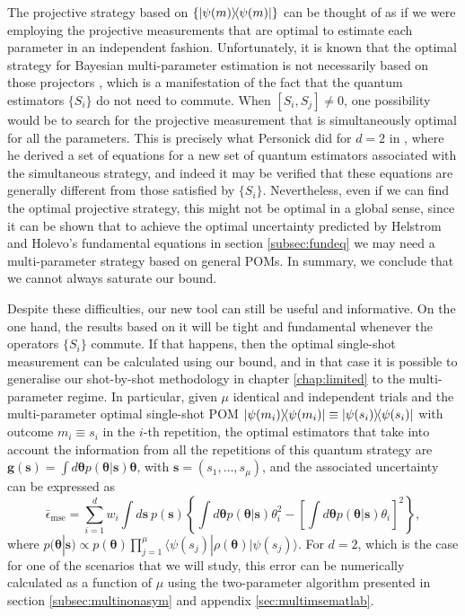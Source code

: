 The projective strategy based on $\lbrace \ketbra{\psi(m)} \rbrace$ can be thought of as if we were employing the projective measurements that are optimal to estimate each parameter in an independent fashion. Unfortunately, it is known that the optimal strategy for Bayesian multi-parameter estimation is not necessarily based on those projectors \cite{helstrom1974, personick1969thesis}, which is a manifestation of the fact that the quantum estimators $\lbrace S_i \rbrace$ do not need to commute. When $[S_i, S_j] \neq 0$, one possibility would be to search for the projective measurement that is simultaneously optimal for all the parameters. This is precisely what Personick did for $d = 2$ in \cite{personick1969thesis}, where he derived a set of equations for a new set of quantum estimators associated with the simultaneous strategy, and indeed it may be verified that these equations are generally different from those satisfied by $\lbrace S_i \rbrace$. Nevertheless, even if we can find the optimal projective strategy, this might not be optimal in a global sense, since it can be shown \cite{helstrom1974} that to achieve the optimal uncertainty predicted by Helstrom and Holevo's fundamental equations in section \ref{subsec:fundeq} we may need a multi-parameter strategy based on general POMs. In summary, we conclude that we cannot always saturate our bound.  

Despite these difficulties, our new tool can still be useful and informative. On the one hand, the results based on it will be tight and fundamental whenever the operators $\lbrace S_i \rbrace$ commute. If that happens, then the optimal single-shot measurement can be calculated using our bound, and in that case it is possible to generalise our shot-by-shot methodology in chapter \ref{chap:limited} to the multi-parameter regime. In particular, given $\mu$ identical and independent trials and the multi-parameter optimal single-shot POM $\ketbra{\psi(m_i)} \equiv \ketbra{\psi(s_i)}$ with outcome $m_i \equiv s_i$ in the $i$-th repetition, the optimal estimators that take into account the information from all the repetitions of this quantum strategy are $\boldsymbol{g}(\boldsymbol{s}) = \int d\boldsymbol{\theta} p(\boldsymbol{\theta}|\boldsymbol{s}) \boldsymbol{\theta}$, with $\boldsymbol{s} = (s_1, \dots, s_\mu)$, and the associated uncertainty can be expressed as 
\begin{equation}
\bar{\epsilon}_{\mathrm{mse}} = \sum_{i=1}^d w_i \int d\boldsymbol{s}~p(\boldsymbol{s}) \left\lbrace \int d\boldsymbol{\theta} p(\boldsymbol{\theta}|\boldsymbol{s}) \theta_i^2 - \left[\int d\boldsymbol{\theta} p(\boldsymbol{\theta}|\boldsymbol{s}) \theta_i \right]^2 \right\rbrace, 
\label{msegenmany}
\end{equation}
where $p(\boldsymbol{\theta}|\boldsymbol{s}) \propto p(\boldsymbol{\theta}) \prod_{j=1}^\mu \langle \psi(s_j) | \rho(\boldsymbol{\theta}) | \psi(s_j)\rangle$. For $d=2$, which is the case for one of the scenarios that we will study, this error can be numerically calculated as a function of $\mu$ using the two-parameter algorithm presented in section \ref{subsec:multinonasym} and appendix \ref{sec:multimsematlab}.

